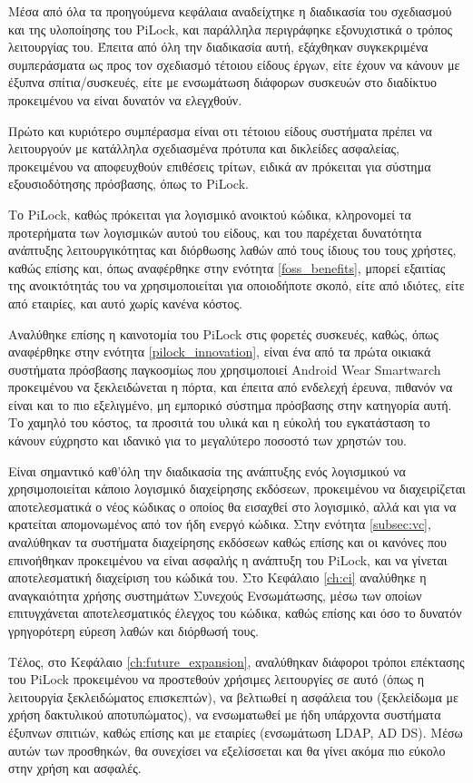 Μέσα από όλα τα προηγούμενα κεφάλαια αναδείχτηκε η διαδικασία του σχεδιασμού και της υλοποίησης του PiLock, και παράλληλα περιγράφηκε εξονυχιστικά ο τρόπος λειτουργίας του. Έπειτα από όλη την διαδικασία αυτή, εξάχθηκαν συγκεκριμένα συμπεράσματα ως προς τον σχεδιασμό τέτοιου είδους έργων, είτε έχουν να κάνουν με έξυπνα σπίτια/συσκευές, είτε με ενσωμάτωση διάφορων συσκευών στο διαδίκτυο προκειμένου να είναι δυνατόν να ελεγχθούν.

Πρώτο και κυριότερο συμπέρασμα είναι οτι τέτοιου είδους συστήματα πρέπει να λειτουργούν με κατάλληλα σχεδιασμένα πρότυπα και δικλείδες ασφαλείας, προκειμένου να αποφευχθούν επιθέσεις τρίτων, ειδικά αν πρόκειται για σύστημα εξουσιοδότησης πρόσβασης, όπως το PiLock.

Το PiLock, καθώς πρόκειται για λογισμικό ανοικτού κώδικα, κληρονομεί τα προτερήματα των λογισμικών αυτού του είδους, και του παρέχεται δυνατότητα ανάπτυξης λειτουργικότητας και διόρθωσης λαθών από τους ίδιους του τους χρήστες, καθώς επίσης και, όπως αναφέρθηκε στην ενότητα \ref{foss_benefits}, μπορεί εξαιτίας της ανοικτότητάς του να χρησιμοποιείται για οποιοδήποτε σκοπό, είτε από ιδιότες, είτε από εταιρίες, και αυτό χωρίς κανένα κόστος.

Αναλύθηκε επίσης η καινοτομία του PiLock στις φορετές συσκευές, καθώς, όπως αναφέρθηκε στην ενότητα \ref{pilock_innovation}, είναι ένα από τα πρώτα οικιακά συστήματα πρόσβασης παγκοσμίως που χρησιμοποιεί Android Wear Smartwarch προκειμένου να ξεκλειδώνεται η πόρτα, και έπειτα από ενδελεχή έρευνα, πιθανόν να είναι και το πιο εξελιγμένο, μη εμπορικό σύστημα πρόσβασης στην κατηγορία αυτή. Το χαμηλό του κόστος, τα προσιτά του υλικά και η εύκολή του εγκατάσταση το κάνουν εύχρηστο και ιδανικό για το μεγαλύτερο ποσοστό των χρηστών του.

Είναι σημαντικό καθ'όλη την διαδικασία της ανάπτυξης ενός λογισμικού να χρησιμοποιείται κάποιο λογισμικό διαχείρησης εκδόσεων, προκειμένου να διαχειρίζεται αποτελεσματικά ο νέος κώδικας ο οποίος θα εισαχθεί στο λογισμικό, αλλά και για να κρατείται απομονωμένος από τον ήδη ενεργό κώδικα. Στην ενότητα \ref{subsec:vc}, αναλύθηκαν τα συστήματα διαχείρησης εκδόσεων καθώς επίσης και οι κανόνες που επινοήθηκαν προκειμένου να είναι ασφαλής η ανάπτυξη του PiLock, και να γίνεται αποτελεσματική διαχείριση του κώδικά του. Στο Κεφάλαιο \ref{ch:ci} αναλύθηκε η αναγκαιότητα χρήσης συστημάτων Συνεχούς Ενσωμάτωσης, μέσω των οποίων επιτυγχάνεται αποτελεσματικός έλεγχος του κώδικα, καθώς επίσης και όσο το δυνατόν γρηγορότερη εύρεση λαθών και διόρθωσή τους.

Τέλος, στο Κεφάλαιο \ref{ch:future_expansion}, αναλύθηκαν διάφοροι τρόποι επέκτασης του PiLock προκειμένου να προστεθούν χρήσιμες λειτουργίες σε αυτό (όπως η λειτουργία ξεκλειδώματος επισκεπτών), να βελτιωθεί η ασφάλεια του (ξεκλείδωμα με χρήση δακτυλικού αποτυπώματος), να ενσωματωθεί με ήδη υπάρχοντα συστήματα έξυπνων σπιτιών, καθώς επίσης και με εταιρίες (ενσωμάτωση LDAP, AD DS). Μέσω αυτών των προσθηκών, θα συνεχίσει να εξελίσσεται και θα γίνει ακόμα πιο εύκολο στην χρήση και ασφαλές.